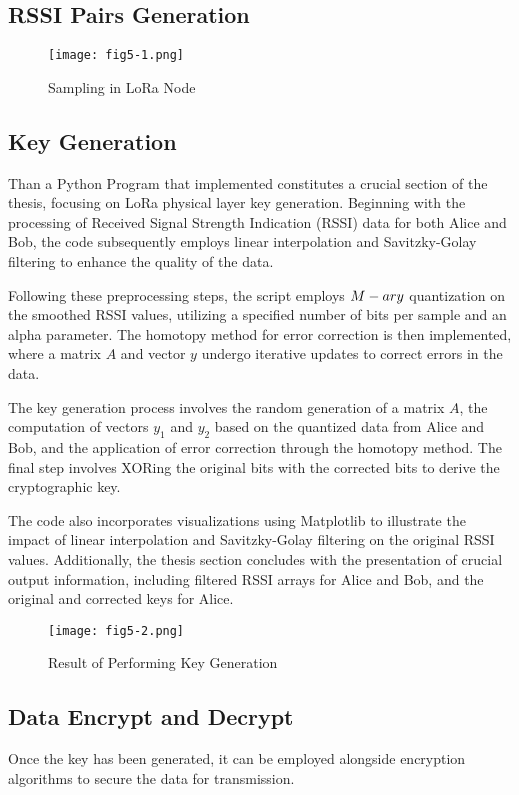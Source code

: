 \subsection{RSSI Pairs Generation}

\begin{figure}
  \centering
  \texttt{[image: fig5-1.png]}
  \caption{Sampling in LoRa Node}
  \label{fig:5-1}
\end{figure}

\subsection{Key Generation}
Than a Python Program that implemented constitutes a crucial section of the thesis, focusing on LoRa physical layer key generation. Beginning with the processing of Received Signal Strength Indication (RSSI) data for both Alice and Bob, the code subsequently employs linear interpolation and Savitzky-Golay filtering to enhance the quality of the data.

Following these preprocessing steps, the script employs $M\--ary$ quantization on the smoothed RSSI values, utilizing a specified number of bits per sample and an alpha parameter. The homotopy method for error correction is then implemented, where a matrix \(A\) and vector \(y\) undergo iterative updates to correct errors in the data.

The key generation process involves the random generation of a matrix \(A\), the computation of vectors \(y_1\) and \(y_2\) based on the quantized data from Alice and Bob, and the application of error correction through the homotopy method. The final step involves XORing the original bits with the corrected bits to derive the cryptographic key.

The code also incorporates visualizations using Matplotlib to illustrate the impact of linear interpolation and Savitzky-Golay filtering on the original RSSI values. Additionally, the thesis section concludes with the presentation of crucial output information, including filtered RSSI arrays for Alice and Bob, and the original and corrected keys for Alice.
\begin{figure}
  \centering
  \texttt{[image: fig5-2.png]}
  \caption{Result of Performing Key Generation}
  \label{fig:5-2}
\end{figure}

\subsection{Data Encrypt and Decrypt}
Once the key has been generated, it can be employed alongside encryption algorithms to secure the data for transmission.

